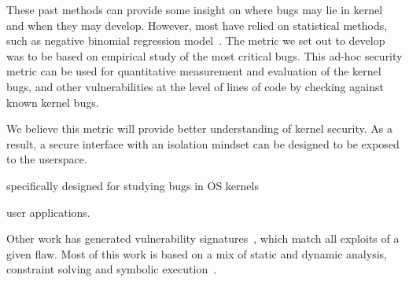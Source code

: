 These past methods can provide some insight on where bugs may lie in kernel and when
they may develop. However, most have relied on statistical methods, such as
negative binomial regression model~\cite{Bug-Location}. The metric we set out to
develop was to be based on empirical study of
the most critical bugs. This ad-hoc security metric can be used for
quantitative measurement and evaluation of the kernel bugs,
and other vulnerabilities at the level of lines of code by checking against
known kernel bugs.

We believe this metric will provide better understanding of kernel security.
As a result, a secure interface with an isolation mindset can be designed
to be exposed to the userspace.

specifically designed for studying bugs in OS kernels

user applications.





Other work has generated vulnerability
signatures~\cite{brumley2006towards}, which match all exploits
of a given flaw. Most of this work is based on a mix of static and
dynamic analysis, constraint solving and symbolic execution~\cite{chou2003static}.


